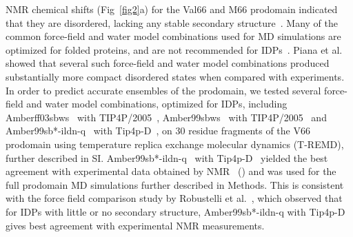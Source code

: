 \documentclass[10pt,letterpaper]{article}
\begin{document}
NMR chemical shifts (Fig~\ref{fig2}a) for the Val66 and M66 prodomain indicated that they are disordered, lacking any stable secondary structure~\cite{Anastasia2013}. Many of the common force-field and water model combinations used for MD simulations are optimized for folded proteins, and are not recommended for IDPs~\cite{Mercadante2015,Piana2015}. Piana et al.~\cite{Piana2015} showed that several such force-field and water model combinations produced substantially more compact disordered states when compared with experiments. In order to predict accurate ensembles of the prodomain, we tested several force-field and water model combinations, optimized for IDPs, including Amberff03sbws~\cite{Best2009, Best2014} with TIP4P/2005~\cite{Abascal2005}, Amber99sbws~\cite{Lindorff-Larsen2010a, Best2014} with TIP4P/2005~\cite{Abascal2005} and Amber99sb*-ildn-q~\cite{Lindorff-Larsen2010a, Hornak2006a} with Tip4p-D~\cite{Piana2015}, on 30 residue fragments of the V66 prodomain using temperature replica exchange molecular dynamics (T-REMD), further described in SI. Amber99sb*-ildn-q~\cite{Lindorff-Larsen2010a, Hornak2006a} with Tip4p-D~\cite{Piana2015} yielded the best agreement with experimental data obtained by NMR~\cite{Anastasia2013} () and was used for the full prodomain MD simulations further described in Methods. This is consistent with the force field comparison study by Robustelli et al.~\cite{Robustelli2018}, which observed that for IDPs with little or no secondary structure, Amber99sb*-ildn-q with Tip4p-D gives best agreement with experimental NMR measurements.
\end{document}
